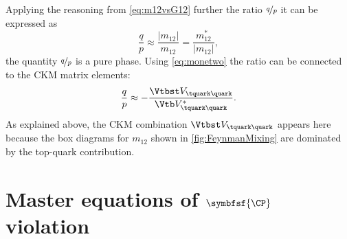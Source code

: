 Applying the reasoning from \cref{eq:m12vsG12} further the ratio $\nicefrac{q}{p}$ it can be expressed as
\begin{equation}
\frac{q}{p}\approx\frac{\left|m_{12}\right|}{m_{12}}=\frac{m_{12}^\ast}{\left|m_{12}\right|},\label{eq:qoverPPurePhase}
\end{equation}
\ie the quantity $\nicefrac{q}{p}$ is a pure phase.
Using \cref{eq:monetwo} the ratio can be connected to the CKM matrix elements:
\begin{equation}
\frac{q}{p}\approx-\frac{\Vtbst V_{\tquark\quark}}{\Vtb V_{\tquark\quark}^\ast}\label{eq:qoverpCKM}.
\end{equation}
As explained above, the CKM combination $\Vtbst V_{\tquark\quark}$ appears here because the box diagrams for $m_{12}$ shown in \cref{fig:FeynmanMixing} are dominated by the top-quark contribution.


\section[head={Master equations of \CP violation},tocentry={Master equations of \CP violation}]{Master equations of $\symbfsf{\CP}$ violation}
\label{sec:formulaeCPV}

